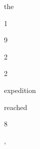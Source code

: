 \documentclass[arwidth=200mm]{standalone}
\begin{document}
{{\colorbox[RGB]{255,250,250}{\strut  the} \colorbox[RGB]{255,254,254}{\strut  }\colorbox[RGB]{254,254,255}{\strut 1}\colorbox[RGB]{255,252,252}{\strut 9}\colorbox[RGB]{252,252,255}{\strut 2}\colorbox[RGB]{248,248,255}{\strut 2} \colorbox[RGB]{255,252,252}{\strut  expedition} \colorbox[RGB]{255,192,192}{\strut  reached} \colorbox[RGB]{255,152,152}{\strut  }\colorbox[RGB]{255,17,17}{\strut 8}\colorbox[RGB]{255,0,0}{\strut ,}}}
\end{document}
